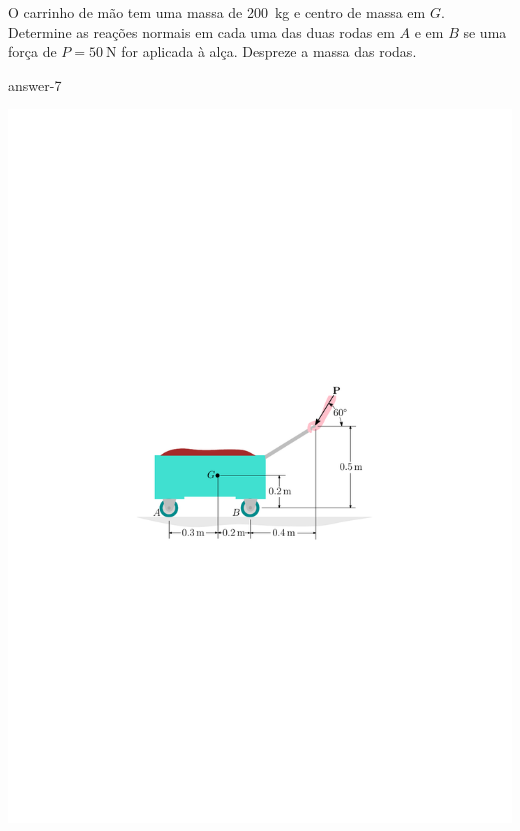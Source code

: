 \item O carrinho de mão tem uma massa de \SI{200}{\kilogram} e centro de massa em $G$. Determine as reações normais em cada uma das duas rodas em $A$ e em $B$ se uma força de $P=\SI{50}{\newton}$ for aplicada à alça. Despreze a massa das rodas.

{answer-7}

\vspace{-1.9cm}
\begin{flushright}
	\includegraphics[scale=1.1]{../../images/draw_6}
\end{flushright}
